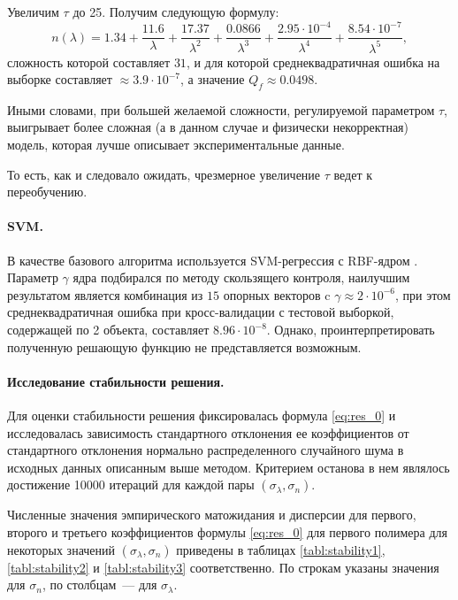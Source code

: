 \documentclass[12pt,a4paper]{article}
\theoremstyle{definition}
\begin{document}
Увеличим $\tau$ до 25. Получим следующую формулу:
\begin{equation}
  n(\lambda) = 1.34 + \frac{11.6}{\lambda} + \frac{17.37}{\lambda^2} + \frac{0.0866}{\lambda^3} + \frac{2.95 \cdot 10^{-4}}{\lambda^4} + \frac{8.54 \cdot 10^{-7}}{\lambda^5},
  \label{eq:res_incorrect}
\end{equation}
сложность которой составляет $31$, и для которой среднеквадратичная ошибка
на выборке составляет $\approx 3.9 \cdot 10^{-7}$,
а значение $Q_f \approx 0.0498$.

Иными словами, при большей желаемой сложности,
регулируемой параметром $\tau$, выигрывает более сложная (а в данном случае и
физически некорректная) модель, которая лучше описывает экспериментальные данные.

То есть, как и следовало ожидать, чрезмерное увеличение $\tau$ ведет к переобучению.

\paragraph{SVM.}

В качестве базового алгоритма используется SVM-регрессия с RBF-ядром \cite{Vapnik79}.
Параметр $\gamma$ ядра подбирался по методу скользящего контроля, наилучшим результатом является
комбинация из $15$ опорных векторов c $\gamma \approx 2 \cdot 10^{-6}$, при этом
среднеквадратичная ошибка при кросс-валидации с тестовой выборкой, содержащей по 2
объекта, составляет $8.96 \cdot 10^{-8}$. Однако, проинтерпретировать полученную
решающую функцию не представляется возможным.

\paragraph{Исследование стабильности решения.}

Для оценки стабильности решения фиксировалась формула \eqref{eq:res_0} и исследовалась
зависимость стандартного отклонения ее коэффициентов от стандартного отклонения
нормально распределенного случайного шума в исходных данных описанным выше методом.
Критерием останова в нем являлось достижение 10000 итераций для каждой пары
$(\sigma_{\lambda}, \sigma_n)$.

Численные значения эмпирического матожидания и дисперсии для первого, второго и третьего
коэффициентов формулы \eqref{eq:res_0} для первого полимера для некоторых значений
$(\sigma_{\lambda}, \sigma_n)$ приведены в таблицах \ref{tabl:stability1},
\ref{tabl:stability2} и \ref{tabl:stability3} соответственно. По строкам указаны значения
для $\sigma_n$, по столбцам~--- для $\sigma_{\lambda}$.
\end{document}
